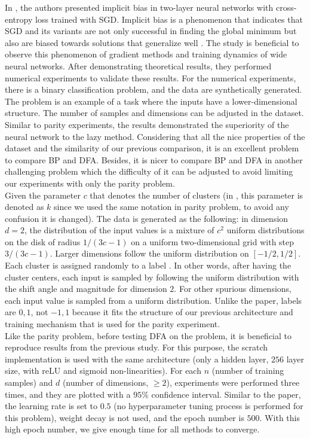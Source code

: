\documentclass[a4paper, nobind]{templates/ociamthesis}
\begin{document}
In \cite{chizat2020implicit}, the authors presented implicit bias in two-layer neural networks with cross-entropy loss trained with SGD. Implicit bias is a phenomenon that indicates that SGD and its variants are not only successful in finding the global minimum but also are biased towards solutions that generalize well \cite{yun2021unifying}. The study is beneficial to observe this phenomenon of gradient methods and training dynamics of wide neural networks. After demonstrating theoretical results, they performed numerical experiments to validate these results. For the numerical experiments, there is a binary classification problem, and the data are synthetically generated. The problem is an example of a task where the inputs have a lower-dimensional structure. The number of samples and dimensions can be adjusted in the dataset. Similar to parity experiments, the results demonstrated the superiority of the neural network to the lazy method. Considering that all the nice properties of the dataset and the similarity of our previous comparison, it is an excellent problem to compare BP and DFA. Besides, it is nicer to compare BP and DFA in another challenging problem which the difficulty of it can be adjusted to avoid limiting our experiments with only the parity problem.\\
\noindent Given the parameter \(c\) that denotes the number of clusters (in \cite{chizat2020implicit}, this parameter is denoted as \(k\) since we used the same notation in parity problem, to avoid any confusion it is changed). The data is generated as the following: in dimension \(d=2\), the distribution of the input values is a mixture of \(c^2\) uniform distributions on the disk of radius \(1/ (3c-1)\) on a uniform two-dimensional grid with step \(3/(3c-1)\). Larger dimensions follow the uniform distribution on \([-1/2,1/2]\). Each cluster is assigned randomly to a label \cite{chizat2020implicit}. In other words, after having the cluster centers, each input is sampled by following the uniform distribution with the shift angle and magnitude for dimension \(2\). For other spurious dimensions, each input value is sampled from a uniform distribution. Unlike the paper, labels are \(0,1\), not \(-1,1\) because it fits the structure of our previous architecture and training mechanism that is used for the parity experiment.\\
Like the parity problem, before testing DFA on the problem, it is beneficial to reproduce results from the previous study. For this purpose, the scratch implementation is used with the same architecture (only a hidden layer, \(256\) layer size, with reLU and sigmoid non-linearities). For each \(n\) (number of training samples) and \(d\) (number of dimensions, \(\geq2\)), experiments were performed three times, and they are plotted with a \(95\%\) confidence interval. Similar to the paper, the learning rate is set to \(0.5\) (no hyperparameter tuning process is performed for this problem), weight decay is not used, and the epoch number is \(500\). With this high epoch number, we give enough time for all methods to converge.
\end{document}
